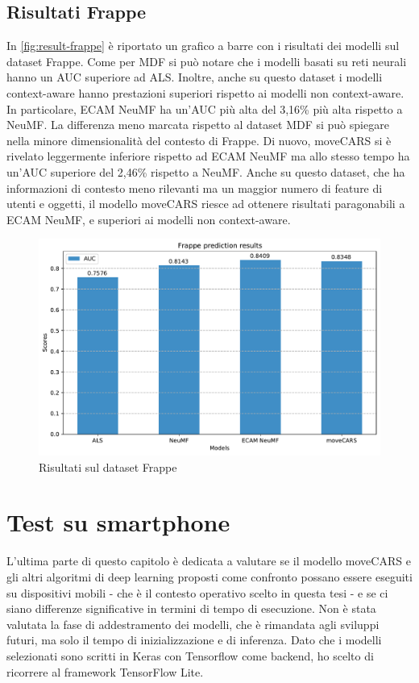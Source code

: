 \documentclass[12pt,italian]{report}
\begin{document}
\subsection{Risultati Frappe}
In \autoref{fig:result-frappe} è riportato un grafico a barre con i risultati dei modelli sul dataset Frappe. Come per MDF si può notare che i modelli basati su reti neurali hanno un AUC superiore ad ALS. Inoltre, anche su questo dataset i modelli context-aware hanno prestazioni superiori rispetto ai modelli non context-aware. In particolare, ECAM NeuMF ha un'AUC più alta del 3,16\% più alta rispetto a NeuMF. La differenza meno marcata rispetto al dataset MDF si può spiegare nella minore dimensionalità del contesto di Frappe. Di nuovo, moveCARS si è rivelato leggermente inferiore rispetto ad ECAM NeuMF ma allo stesso tempo ha un'AUC superiore del 2,46\% rispetto a NeuMF. Anche su questo dataset, che ha informazioni di contesto meno rilevanti ma un maggior numero di feature di utenti e oggetti, il modello moveCARS riesce ad ottenere risultati paragonabili a ECAM NeuMF, e superiori ai modelli non context-aware.

\begin{figure}
  \centering
  \includegraphics[width=\linewidth]{immagini/frappe_test_results.pdf}
  \caption{Risultati sul dataset Frappe}
  \label{fig:result-frappe}
\end{figure}

\section{Test su smartphone} \label{sec:smartphone}
L'ultima parte di questo capitolo è dedicata a valutare se il modello moveCARS e gli altri algoritmi di deep learning proposti come confronto possano essere eseguiti su dispositivi mobili  - che è il contesto operativo scelto in questa tesi - e se ci siano differenze significative in termini di tempo di esecuzione. Non è stata valutata la fase di addestramento dei modelli, che è rimandata agli sviluppi futuri, ma solo il tempo di inizializzazione e di inferenza. Dato che i modelli selezionati sono scritti in Keras con Tensorflow come backend, ho scelto di ricorrere al framework TensorFlow Lite. 
\end{document}
